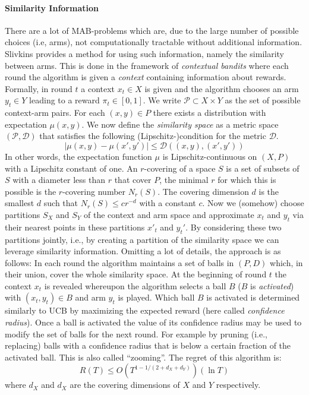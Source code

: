 \paragraph{Similarity Information} 
There are a lot of MAB-problems which are, due to the large number of possible choices (i.e, arms), not computationally tractable without additional information. Slivkins \cite{slivkins2014contextual} provides a method for using such information, namely the similarity between arms. This is done in the framework of \textit{contextual bandits} where each round the algorithm is given a \textit{context} containing information about rewards. Formally, in round $t$ a context $x_t \in X$ is given and the algorithm chooses an arm $y_t \in Y$ leading to a reward $\pi_t \in [0,1]$. We write $\mathcal{P} \subset X \times Y$ as the set of possible context-arm pairs. For each $(x,y) \in P$ there exists a distribution with expectation $\mu(x,y)$. We now define the \textit{similarity space} as a metric space $(\mathcal{P},\mathcal{D})$ that satisfies the following (Lipschitz-)condition for the metric $\mathcal{D}$.
\begin{equation*}
    \left| \mu(x,y) - \mu(x',y') \right| \leq \mathcal{D}((x,y),(x',y'))
\end{equation*}
In other words, the expectation function $\mu$ is Lipschitz-continuous on $(X,P)$ with a Lipschitz constant of one. An $r$-covering of a space $S$ is a set of subsets of $S$ with a diameter less than $r$ that cover $P$, the minimal $r$ for which this is possible is the $r$-covering number $N_r(S)$. The covering dimension $d$ is the smallest $d$ such that $N_r(S) \leq cr^{-d}$ with a constant $c$. Now we (somehow) choose partitions $S_X$ and $S_Y$ of the context and arm space and approximate $x_t$ and $y_t$ via their nearest points in these partitions $x'_t$ and $y_t'$. By considering these two partitions jointly, i.e., by creating a partition of the similarity space we can leverage similarity information. Omitting a lot of details, the approach is as follows: In each round the algorithm maintains a set of balls in $(P,D)$ which, in their union, cover the whole similarity space. At the beginning of round $t$ the context $x_t$ is revealed whereupon the algorithm selects a ball $B$ ($B$ is \textit{activated}) with $(x_t,y_t) \in B$ and arm $y_t$ is played. Which ball $B$ is activated is determined similarly to UCB by maximizing the expected reward (here called \textit{confidence radius}). Once a ball is activated the value of its confidence radius may be used to modify the set of balls for the next round. For example by pruning (i.e., replacing) balls with a confidence radius that is below a certain fraction of the activated ball. This is also called \enquote{zooming}. The regret of this algorithm is:
\begin{equation*}
    R(T) \leq O(T^{1-1/(2+d_X+d_Y)}) (\ln T)
\end{equation*} where $d_X$ and $d_X$ are the covering dimensions of $X$ and $Y$ respectively. 
